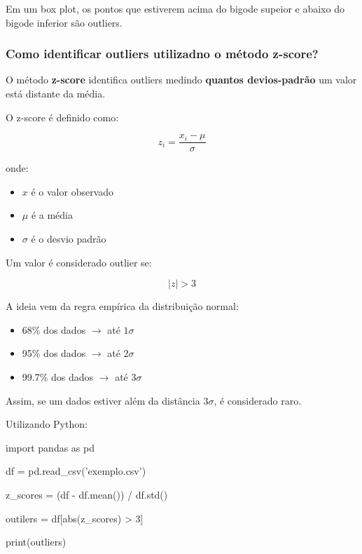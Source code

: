 \documentclass{article}
\begin{document}
Em um box plot, os pontos que estiverem acima do bigode supeior e abaixo do bigode inferior são outliers.

\subsubsection{Como identificar outliers utilizadno o método z-score?}

O método \textbf{z-score} identifica outliers medindo \textbf{quantos devios-padrão} um valor está distante da média.

O z-score é definido como:

\begin{equation*}
    z_i = \frac{x_i - \mu}{\sigma}
\end{equation*}

onde: 

\begin{itemize}
    \item $x$ é o valor observado
    \item $\mu$ é a média 
    \item $\sigma$ é o desvio padrão
\end{itemize}

Um valor é considerado outlier se:

\begin{equation}
    |z| > 3
\end{equation}

A ideia vem da regra empírica da distribuição normal:

\begin{itemize}
    \item 68\% dos dados $\rightarrow$ até $1\sigma$
    \item 95\% dos dados $\rightarrow$ até $2\sigma$
    \item 99.7\% dos dados $\rightarrow$ até $3\sigma$
\end{itemize}

Assim, se um dados estiver além da distância $3\sigma$, é considerado raro.

Utilizando Python:

\begin{pythoncode}
import pandas as pd 

df = pd.read_csv('exemplo.csv')

z_scores = (df - df.mean()) / df.std()

outilers = df[abs(z_scores) > 3]

print(outliers)
\end{pythoncode}
\end{document}
